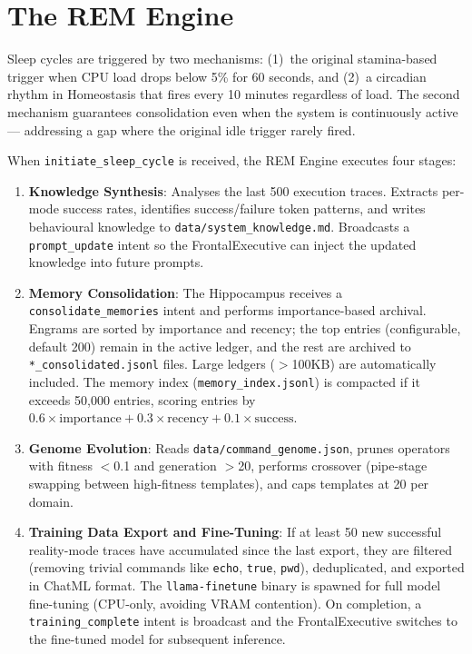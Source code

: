 \documentclass[12pt,a4paper]{report}
\begin{document}
\section{The REM Engine}
Sleep cycles are triggered by two mechanisms: (1)~the original stamina-based trigger when CPU load drops below 5\% for 60 seconds, and (2)~a circadian rhythm in Homeostasis that fires every 10 minutes regardless of load. The second mechanism guarantees consolidation even when the system is continuously active --- addressing a gap where the original idle trigger rarely fired.

When \texttt{initiate\_sleep\_cycle} is received, the REM Engine executes four stages:

\begin{enumerate}
    \item \textbf{Knowledge Synthesis}: Analyses the last 500 execution traces. Extracts per-mode success rates, identifies success/failure token patterns, and writes behavioural knowledge to \texttt{data/system\_knowledge.md}. Broadcasts a \texttt{prompt\_update} intent so the FrontalExecutive can inject the updated knowledge into future prompts.
    \item \textbf{Memory Consolidation}: The Hippocampus receives a \texttt{consolidate\_memories} intent and performs importance-based archival. Engrams are sorted by importance and recency; the top entries (configurable, default 200) remain in the active ledger, and the rest are archived to \texttt{*\_consolidated.jsonl} files. Large ledgers ($>$100KB) are automatically included. The memory index (\texttt{memory\_index.jsonl}) is compacted if it exceeds 50{,}000 entries, scoring entries by $0.6 \times \text{importance} + 0.3 \times \text{recency} + 0.1 \times \text{success}$.
    \item \textbf{Genome Evolution}: Reads \texttt{data/command\_genome.json}, prunes operators with fitness $<$0.1 and generation $>$20, performs crossover (pipe-stage swapping between high-fitness templates), and caps templates at 20 per domain.
    \item \textbf{Training Data Export and Fine-Tuning}: If at least 50 new successful reality-mode traces have accumulated since the last export, they are filtered (removing trivial commands like \texttt{echo}, \texttt{true}, \texttt{pwd}), deduplicated, and exported in ChatML format. The \texttt{llama-finetune} binary is spawned for full model fine-tuning (CPU-only, avoiding VRAM contention). On completion, a \texttt{training\_complete} intent is broadcast and the FrontalExecutive switches to the fine-tuned model for subsequent inference.
\end{enumerate}
\end{document}

